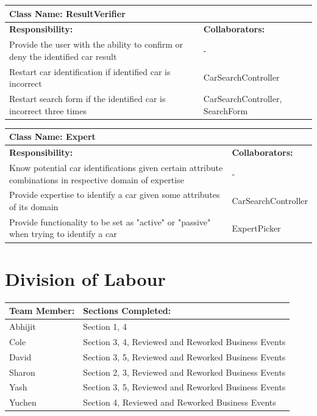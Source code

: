 \documentclass[12pt]{article}
\begin{document}
	\begin{table}[ht]
		\centering
		\begin{tabular}{|p{5cm}|p{5cm}|}
			\hline 
			\multicolumn{2}{|l|}{\textbf{Class Name:} ResultVerifier} \\
			\hline
			\textbf{Responsibility:} & \textbf{Collaborators:} \\
			\hline
			Provide the user with the ability to confirm or deny the identified car result & -\\
			\hline
			Restart car identification if identified car is incorrect & CarSearchController\\
			\hline
			Restart search form if the identified car is incorrect three times & CarSearchController, SearchForm\\
			\hline
		\end{tabular}
	\end{table}

	\begin{table}[ht]
		\centering
		\begin{tabular}{|p{5cm}|p{5cm}|}
			\hline 
			\multicolumn{2}{|l|}{\textbf{Class Name:} Expert} \\
			\hline
			\textbf{Responsibility:} & \textbf{Collaborators:} \\
			\hline
			Know potential car identifications given certain attribute combinations in respective domain of expertise & -\\
			\hline
			Provide expertise to identify a car given some attributes of its domain & CarSearchController\\
			\hline
			Provide functionality to be set as "active" or "passive" when trying to identify a car & ExpertPicker\\
			\hline
		\end{tabular}
	\end{table}

\FloatBarrier
\appendix
\section{Division of Labour}
\label{sec:division_of_labour}
\begin{table}[ht]
	\centering
	\begin{tabular}{|p{5cm}|p{5cm}|}
		\hline 
		\textbf{Team Member:} & \textbf{Sections Completed:}\\
		\hline
		Abhijit & Section 1, 4\\
		\hline
		Cole & Section 3, 4, Reviewed and Reworked Business Events\\
		\hline
		David & Section 3, 5, Reviewed and Reworked Business Events\\
		\hline
		Sharon & Section 2, 3, Reviewed and Reworked Business Events\\
		\hline
		Yash & Section 3, 5, Reviewed and Reworked Business Events\\
		\hline
		Yuchen & Section 4, Reviewed and Reworked Business Events\\
		\hline
	\end{tabular}
\end{table}
\end{document}
